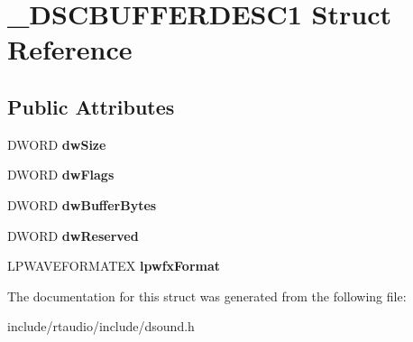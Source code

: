 \hypertarget{struct___d_s_c_b_u_f_f_e_r_d_e_s_c1}{}\section{\+\_\+\+D\+S\+C\+B\+U\+F\+F\+E\+R\+D\+E\+S\+C1 Struct Reference}
\label{struct___d_s_c_b_u_f_f_e_r_d_e_s_c1}
\subsection*{Public Attributes}
\begin{DoxyCompactItemize}
\item 
D\+W\+O\+RD {\bfseries dw\+Size}\hypertarget{struct___d_s_c_b_u_f_f_e_r_d_e_s_c1_aa4f2136781d2b7307148743099283e0d}{}\label{struct___d_s_c_b_u_f_f_e_r_d_e_s_c1_aa4f2136781d2b7307148743099283e0d}

\item 
D\+W\+O\+RD {\bfseries dw\+Flags}\hypertarget{struct___d_s_c_b_u_f_f_e_r_d_e_s_c1_a164f78a1569d70f19d04629ca30d1e05}{}\label{struct___d_s_c_b_u_f_f_e_r_d_e_s_c1_a164f78a1569d70f19d04629ca30d1e05}

\item 
D\+W\+O\+RD {\bfseries dw\+Buffer\+Bytes}\hypertarget{struct___d_s_c_b_u_f_f_e_r_d_e_s_c1_a405cc9a56118fe6d4d0818361dac7747}{}\label{struct___d_s_c_b_u_f_f_e_r_d_e_s_c1_a405cc9a56118fe6d4d0818361dac7747}

\item 
D\+W\+O\+RD {\bfseries dw\+Reserved}\hypertarget{struct___d_s_c_b_u_f_f_e_r_d_e_s_c1_a14c5cc2df35c64eeee29b5d24d20c2c8}{}\label{struct___d_s_c_b_u_f_f_e_r_d_e_s_c1_a14c5cc2df35c64eeee29b5d24d20c2c8}

\item 
L\+P\+W\+A\+V\+E\+F\+O\+R\+M\+A\+T\+EX {\bfseries lpwfx\+Format}\hypertarget{struct___d_s_c_b_u_f_f_e_r_d_e_s_c1_aecafb3a320cd5a09f7e4b693d25c14a3}{}\label{struct___d_s_c_b_u_f_f_e_r_d_e_s_c1_aecafb3a320cd5a09f7e4b693d25c14a3}

\end{DoxyCompactItemize}


The documentation for this struct was generated from the following file\+:\begin{DoxyCompactItemize}
\item 
include/rtaudio/include/dsound.\+h\end{DoxyCompactItemize}

